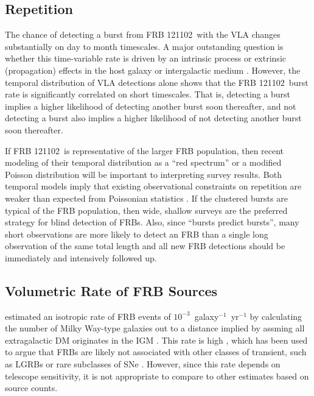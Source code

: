 \documentclass[twocolumn]{aastex61}
\newcommand{\frb}{FRB 121102}
\begin{document}
\subsection{Repetition}

The chance of detecting a burst from \frb\ with the VLA changes substantially on day to month timescales. A major outstanding question is whether this time-variable rate is driven by an intrinsic process \citep{2016ApJ...826..226K} or extrinsic (propagation) effects in the host galaxy or intergalactic medium \citep{2017arXiv170306580C}. However, the temporal distribution of VLA detections alone shows that the \frb\ burst rate is significantly correlated on short timescales. That is, detecting a burst implies a higher likelihood of detecting another burst soon thereafter, and not detecting a burst also implies a higher likelihood of not detecting another burst soon thereafter.

If \frb\ is representative of the larger FRB population, then recent modeling of their temporal distribution as a ``red spectrum'' \citep{2016MNRAS.458L..89C} or a modified Poisson distribution \citep{2017arXiv170504881O} will be important to interpreting survey results. Both temporal models imply that existing observational constraints on repetition are weaker than expected from Poissonian statistics \citep{2015MNRAS.454..457P, 2015ApJ...807...16L}. If the clustered bursts are typical of the FRB population, then wide, shallow surveys are the preferred strategy for blind detection of FRBs. Also, since ``bursts predict bursts'', many short observations are more likely to detect an FRB than a single long observation of the same total length and all new FRB detections should be immediately and intensively followed up.

\subsection{Volumetric Rate of FRB Sources}

\citet{2013Sci...341...53T} estimated an isotropic rate of FRB events of $10^{-3}$\ galaxy$^{-1}$\ yr$^{-1}$ by calculating the number of Milky Way-type galaxies out to a distance implied by assming all extragalactic DM originates in the IGM \citep[$z\approx0.9$\ for DM$\approx z\times900\ \rm{pc}\ \rm{cm}^{-3}$;][]{2003ApJ...598L..79I,2004MNRAS.348..999I}. This rate is high \citep[comparable to the rate of core-collapse supernovae;][]{2006Natur.439...45D}, which has been used to argue that FRBs are likely not associated with other classes of transient, such as LGRBs or rare subclasses of SNe \citep{2006ARA&A..44..507W}. However, since this rate depends on telescope sensitivity, it is not appropriate to compare to other estimates based on source counts.
\end{document}
